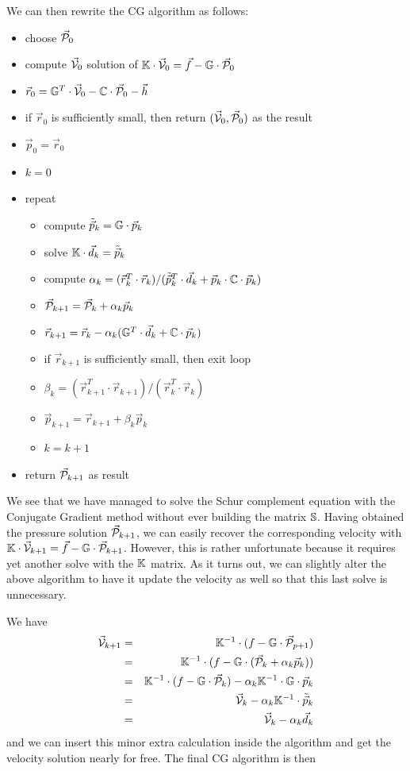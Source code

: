 We can then rewrite the CG algorithm as follows: 
\begin{itemize}
\item choose $\vec{\cal P}_0$
\item compute $\vec{\cal V}_0$ solution of ${\mathbb{K}}\cdot \vec{\cal V}_0 =\vec{f}- {\mathbb{G}}\cdot \vec{\cal P}_0$ 
\item $\vec{r}_0 = {\mathbb{G}}^T\cdot \vec{\cal V}_0 - {\mathbb{C}} \cdot \vec{\cal P}_0 - \vec{h}$ 
\item if $\vec{r}_0$ is sufficiently small, then return $(\vec{\cal V}_0,\vec{\cal P}_0)$ as the result
\item $\vec{p}_0=\vec{r}_0$
\item $k=0$
\item repeat
\begin{itemize}
\item compute $\tilde{\vec{p}}_k = {\mathbb{G}}\cdot \vec{p}_k$
\item solve ${\mathbb{K}}\cdot  \vec{d}_k = \tilde{\vec{p}}_k$
\item compute $\alpha_k=(\vec{r}_k^T \cdot  \vec{r}_k)/
              (\tilde{\vec{p}}_k^T\cdot \vec{d}_k + \vec{p}_k\cdot {\mathbb{C}}\cdot\vec{p}_k)$
\item $\vec{\cal P}_{k+1} = \vec{\cal P}_k+\alpha_k \vec{p}_k$
\item $\vec{r}_{k+1} = \vec{r}_k - \alpha_k ({\mathbb{G}}^T \cdot \vec{d}_k + {\mathbb{C}} \cdot \vec{p}_k) $
\item if $\vec{r}_{k+1}$ is sufficiently small, then exit loop
\item $\beta_k=(\vec{r}_{k+1}^T \cdot \vec{r}_{k+1})/(\vec{r}_k^T \cdot \vec{r}_k)$
\item $\vec{p}_{k+1} =\vec{r}_{k+1}+ \beta_k \vec{p}_k$
\item $k=k+1$
\end{itemize}
\item return $\vec{\cal P}_{k+1}$ as result
\end{itemize}
We see that we have managed to solve the Schur complement equation with the Conjugate Gradient method
without ever building the matrix ${\mathbb{S}}$. Having obtained the pressure solution $\vec{\cal P}_{k+1}$, 
we can easily recover 
the corresponding velocity with ${\mathbb{K}}\cdot \vec{\cal V}_{k+1} =\vec{f}- {\mathbb{G}}\cdot \vec{\cal P}_{k+1}$. 
However, this is rather unfortunate because it requires yet another solve with the ${\mathbb{K}}$ matrix. 
As it turns out, we can slightly alter the above algorithm to have it update the velocity 
as well so that this last solve is unnecessary.

We have 
\begin{eqnarray}
\vec{\cal V}_{k+1} 
&=& {\mathbb{K}}^{-1}\cdot (f - {\mathbb{G}}\cdot \vec{\cal P}_{p+1} )\\
&=& {\mathbb{K}}^{-1}\cdot (f - {\mathbb{G}}\cdot (\vec{\cal P}_k+\alpha_k \vec{p}_k) ) \\
&=& {\mathbb{K}}^{-1}\cdot (f - {\mathbb{G}}\cdot \vec{\cal P}_k) - \alpha_k {\mathbb{K}}^{-1}\cdot {\mathbb{G}} \cdot \vec{p}_k \\
&=& \vec{\cal V}_k - \alpha_k {\mathbb{K}}^{-1}\cdot \tilde{\vec{p}}_k  \\
&=& \vec{\cal V}_k - \alpha_k \vec{d}_k 
\end{eqnarray}
and we can insert this minor extra calculation inside the algorithm and get the velocity solution 
nearly for free. The final CG algorithm is then 

